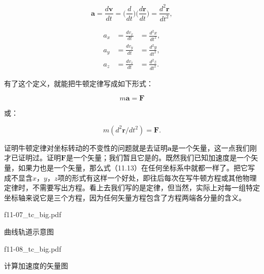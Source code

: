 \documentclass[12pt,oneside]{book}
\providecommand{\ddt}[2]{\frac{d#1}{d#2}}
\providecommand{\FLPvec}[1]{\boldsymbol{#1}}
\providecommand{\FLPF}[0]{\FLPvec{F}}
\providecommand{\FLPa}[0]{\FLPvec{a}}
\providecommand{\FLPr}[0]{\FLPvec{r}}
\providecommand{\FLPv}[0]{\FLPvec{v}}
\begin{document}
\begin{equation}
\label{Eq:I:11:11}
\FLPa=\ddt{\FLPv}{t} =
\biggl(\ddt{}{t}\biggr)\biggl(\ddt{\FLPr}{t}\biggr) =
\frac{d^2\FLPr}{dt^2},
\end{equation}

\begin{equation}
\begin{alignedat}{2}
a_x &= \ddt{v_x}{t} &= \frac{d^2x}{dt^2},\\[1ex]
a_y &= \ddt{v_y}{t} &= \frac{d^2y}{dt^2},\\[1ex]
a_z &= \ddt{v_z}{t} &= \frac{d^2z}{dt^2}.
\end{alignedat}
\label{Eq:I:11:12}
\end{equation}

有了这个定义，就能把牛顿定律写成如下形式：

\begin{equation}
\label{Eq:I:11:13}
m\FLPa = \FLPF
\end{equation}

或：


\begin{equation}
\label{Eq:I:11:14}
m(d^2\FLPr/dt^2) = \FLPF.
\end{equation}

证明牛顿定律对坐标转动的不变性的问题就是去证明$\boldsymbol{a}$是一个矢量，这一点我们刚才已证明过。证明$\boldsymbol{F}$是一个矢量；我们暂且它是的。既然我们已知加速度是一个矢量，如果力也是一个矢量，那么式（11.13）在任何坐标系中就都一样了。把它写成不显含$x$，$y$，$z$项的形式有这样一个好处，即往后每次在写牛顿方程或其他物理定律时，不需要写出方程。看上去我们写的是定律，但当然，实际上对每一组特定坐标轴来说它是三个方程，因为任何矢量方程包含了方程两端各分量的含义。


\begin{fig}{f11-07_tc_big.pdf}
\caption{曲线轨道示意图}
\label{fig:图11-7}
\end{fig}

\begin{fig}{f11-08_tc_big.pdf}
\caption{计算加速度的矢量图}
\label{fig:图11-8}
\end{fig}
\end{document}
